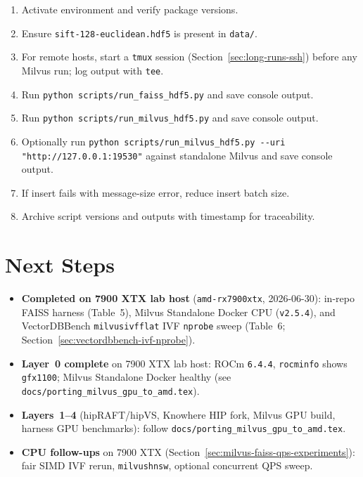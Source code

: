 \documentclass[11pt,a4paper]{article}
\begin{document}
\begin{enumerate}[label=\textbf{R\arabic*.}, leftmargin=*]
  \item Activate environment and verify package versions.
  \item Ensure \texttt{sift-128-euclidean.hdf5} is present in \texttt{data/}.
  \item For remote hosts, start a \texttt{tmux} session (Section~\ref{sec:long-runs-ssh})
        before any Milvus run; log output with \texttt{tee}.
  \item Run \verb|python scripts/run_faiss_hdf5.py| and save console output.
  \item Run \verb|python scripts/run_milvus_hdf5.py| and save console output.
  \item Optionally run \verb|python scripts/run_milvus_hdf5.py --uri "http://127.0.0.1:19530"|
        against standalone Milvus and save console output.
  \item If insert fails with message-size error, reduce insert batch size.
  \item Archive script versions and outputs with timestamp for traceability.
\end{enumerate}

\section{Next Steps}

\begin{itemize}[leftmargin=*]
  \item \textbf{Completed on 7900 XTX lab host} (\texttt{amd-rx7900xtx}, 2026-06-30): in-repo FAISS
        harness (Table~5), Milvus Standalone Docker CPU (\texttt{v2.5.4}), and VectorDBBench
        \texttt{milvusivfflat} IVF \texttt{nprobe} sweep (Table~6;
        Section~\ref{sec:vectordbbench-ivf-nprobe}).
  \item \textbf{Layer~0 complete} on 7900 XTX lab host: ROCm \texttt{6.4.4},
        \texttt{rocminfo} shows \texttt{gfx1100}; Milvus Standalone Docker healthy
        (see \texttt{docs/porting\_milvus\_gpu\_to\_amd.tex}).
  \item \textbf{Layers~1--4} (hipRAFT/hipVS, Knowhere HIP fork, Milvus GPU build, harness GPU
        benchmarks): follow \texttt{docs/porting\_milvus\_gpu\_to\_amd.tex}.
  \item \textbf{CPU follow-ups} on 7900 XTX (Section~\ref{sec:milvus-faiss-qps-experiments}):
        fair SIMD IVF rerun, \texttt{milvushnsw}, optional concurrent QPS sweep.
\end{itemize}
\end{document}
